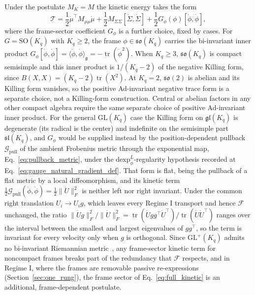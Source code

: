 Under the postulate $M_K = M$ the kinetic energy takes the form
\begin{equation}
\mathcal{T} = \frac{1}{2}\dot{\mu}^\top M_{\mu\mu} \dot{\mu} + \frac{1}{2}M_{\Sigma\Sigma}[\dot{\Sigma}, \dot{\Sigma}] + \frac{1}{2} G_\phi(\phi)[\dot{\phi}, \dot{\phi}],
\label{eq:full_kinetic}
\end{equation}
where the frame-sector coefficient $G_\phi$ is a further choice, fixed by cases. For $G=\mathrm{SO}(K_q)$ with $K_q\ge2$, the frame $\phi\in\mathfrak{so}(K_q)$ carries the bi-invariant inner product $G_\phi[\dot{\phi},\dot{\phi}]=\langle\dot{\phi},\dot{\phi}\rangle_{\mathfrak{g}}=-\operatorname{tr}(\dot{\phi}^2)$. When $K_q\ge3$, $\mathfrak{so}(K_q)$ is compact semisimple and this inner product is $1/(K_q-2)$ of the negative Killing form, since $B(X,X)=(K_q-2)\operatorname{tr}(X^2)$. At $K_q=2$, $\mathfrak{so}(2)$ is abelian and its Killing form vanishes, so the positive Ad-invariant negative trace form is a separate choice, not a Killing-form construction. Central or abelian factors in any other compact algebra require the same separate choice of positive Ad-invariant inner product. For the general $\mathrm{GL}(K_q)$ case the Killing form on $\mathfrak{gl}(K_q)$ is degenerate (its radical is the center) and indefinite on the semisimple part $\mathfrak{sl}(K_q)$, and $G_\phi$ would be supplied instead by the position-dependent pullback $\mathcal{G}_{\mathrm{pull}}$ of the ambient Frobenius metric through the exponential map, Eq.~\eqref{eq:pullback_metric}, under the $\mathrm{dexp}^{L}_\phi$-regularity hypothesis recorded at Eq.~\eqref{eq:gauge_natural_gradient_def}. That form is flat, being the pullback of a flat metric by a local diffeomorphism, and its kinetic term $\tfrac12\mathcal{G}_{\mathrm{pull}}(\dot{\phi}, \dot{\phi}) = \tfrac12\|\dot{U}\|_F^2$ is neither left nor right invariant. Under the common right translation $U_i \to U_i g$, which leaves every Regime I transport and hence $\mathcal{F}$ unchanged, the ratio $\|\dot{U}g\|_F^2/\|\dot{U}\|_F^2 = \operatorname{tr}(\dot{U}gg^\top\dot{U}^\top)/\operatorname{tr}(\dot{U}\dot{U}^\top)$ ranges over the interval between the smallest and largest eigenvalues of $gg^\top$, so the term is invariant for every velocity only when $g$ is orthogonal. Since $\mathrm{GL}^+(K_q)$ admits no bi-invariant Riemannian metric~\cite{Milnor1976}, any frame-sector kinetic term for noncompact frames breaks part of the redundancy that $\mathcal{F}$ respects, and in Regime I, where the frames are removable passive re-expressions (Section~\ref{sec:one_rung}), the frame sector of Eq.~\eqref{eq:full_kinetic} is an additional, frame-dependent postulate.

